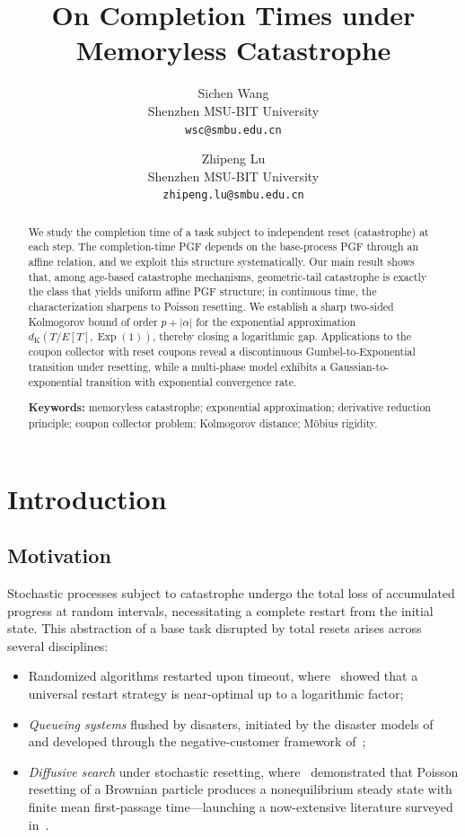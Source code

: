 \documentclass[11pt]{article}
\title{On Completion Times under Memoryless Catastrophe}
\author{%
  Sichen Wang\\
  \small Shenzhen MSU-BIT University\\
  \small\texttt{wsc@smbu.edu.cn}
  \and
  Zhipeng Lu\\
  \small Shenzhen MSU-BIT University\\
  \small\texttt{zhipeng.lu@smbu.edu.cn}
}
\date{}
\theoremstyle{plain}
\theoremstyle{definition}
\theoremstyle{remark}
\DeclareMathOperator{\Exp}{Exp}
\newcommand{\dK}{d_{\mathrm{K}}}
\begin{document}
\maketitle

\begin{abstract}
We study the completion time of a task subject to independent reset (catastrophe) at each step. The completion-time PGF depends on the base-process PGF through an affine relation, and we exploit this structure systematically. Our main result shows that, among age-based catastrophe mechanisms, geometric-tail catastrophe is exactly the class that yields uniform affine PGF structure; in continuous time, the characterization sharpens to Poisson resetting. We establish a sharp two-sided Kolmogorov bound of order $p+|\alpha|$ for the exponential approximation $\dK(T/E[T],\Exp(1))$, thereby closing a logarithmic gap. Applications to the coupon collector with reset coupons reveal a discontinuous Gumbel-to-Exponential transition under resetting, while a multi-phase model exhibits a Gaussian-to-exponential transition with exponential convergence rate.

\medskip
\noindent\textbf{Keywords:} memoryless catastrophe; exponential approximation; derivative reduction principle; coupon collector problem; Kolmogorov distance; M\"{o}bius rigidity.
\end{abstract}

\section{Introduction}\label{sec:intro}

\subsection{Motivation}

Stochastic processes subject to catastrophe undergo the total loss of accumulated progress at random intervals, necessitating a complete restart from the initial state. This abstraction of a base task disrupted by total resets arises across several disciplines:
\begin{itemize}
\item Randomized algorithms restarted upon timeout, where~\cite{LSZ93} showed that a universal restart strategy is near-optimal up to a logarithmic factor;
\item \emph{Queueing systems} flushed by disasters, initiated by the disaster models of~\cite{BGR82} and developed through the negative-customer framework of~\cite{Gelenbe91};
\item \emph{Diffusive search} under stochastic resetting, where~\cite{EM11} demonstrated that Poisson resetting of a Brownian particle produces a nonequilibrium steady state with finite mean first-passage time---launching a now-extensive literature surveyed in~\cite{EMS20}.
\end{itemize}
\end{document}
